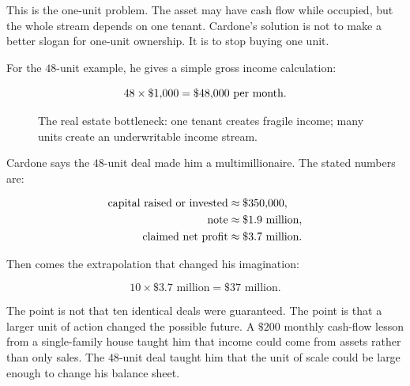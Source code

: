 This is the one-unit problem. The asset may have cash flow while occupied, but the whole stream depends on one tenant. Cardone's solution is not to make a better slogan for one-unit ownership. It is to stop buying one unit.

For the \(48\)-unit example, he gives a simple gross income calculation:

\begin{equation}
48\times \$1{,}000
=
\$48{,}000\hbox{ per month}.
\end{equation}

\begin{figure}
\centering
{}
\caption{The real estate bottleneck: one tenant creates fragile income; many units create an underwritable income stream.}
\end{figure}

Cardone says the \(48\)-unit deal made him a multimillionaire. The stated numbers are:

\begin{align}
\hbox{capital raised or invested} &\approx \$350{,}000,\\
\hbox{note} &\approx \$1.9\text{ million},\\
\hbox{claimed net profit} &\approx \$3.7\text{ million}.
\end{align}

Then comes the extrapolation that changed his imagination:

\begin{equation}
10\times \$3.7\text{ million}
=
\$37\text{ million}.
\end{equation}

The point is not that ten identical deals were guaranteed. The point is that a larger unit of action changed the possible future. A \(\$200\) monthly cash-flow lesson from a single-family house taught him that income could come from assets rather than only sales. The \(48\)-unit deal taught him that the unit of scale could be large enough to change his balance sheet.

